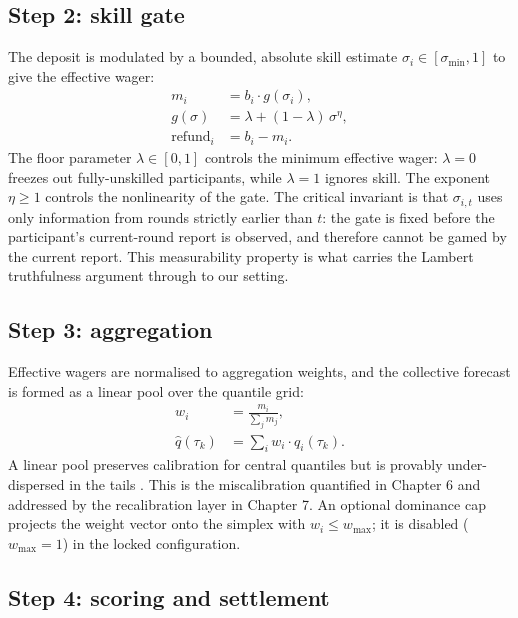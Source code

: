 \documentclass[
  11pt,
  a4paper,
  oneside]{report}
\begin{document}
\subsection{Step 2: skill gate}\label{step-2-skill-gate}

The deposit is modulated by a bounded, absolute skill estimate
\(\sigma_i \in [\sigma_{\min}, 1]\) to give the effective wager:
\begin{align}
  m_i &= b_i \cdot g(\sigma_i), \\
  g(\sigma) &= \lambda + (1 - \lambda)\, \sigma^{\eta}, \\
  \mathrm{refund}_i &= b_i - m_i.
\end{align} The floor parameter \(\lambda \in [0, 1]\) controls the
minimum effective wager: \(\lambda = 0\) freezes out fully-unskilled
participants, while \(\lambda = 1\) ignores skill. The exponent
\(\eta \geq 1\) controls the nonlinearity of the gate. The critical
invariant is that \(\sigma_{i,t}\) uses only information from rounds
strictly earlier than \(t\): the gate is fixed before the participant's
current-round report is observed, and therefore cannot be gamed by the
current report. This measurability property is what carries the Lambert
truthfulness argument through to our setting.

\subsection{Step 3: aggregation}\label{step-3-aggregation}

Effective wagers are normalised to aggregation weights, and the
collective forecast is formed as a linear pool over the quantile grid:
\begin{align}
  w_i &= \frac{m_i}{\sum_j m_j}, \\
  \hat q(\tau_k) &= \sum_i w_i \cdot q_i(\tau_k).
\end{align} A linear pool preserves calibration for central quantiles
but is provably under-dispersed in the tails
\citep{ranjan2010combining}. This is the miscalibration quantified in
Chapter 6 and addressed by the recalibration layer in Chapter 7. An
optional dominance cap projects the weight vector onto the simplex with
\(w_i \leq w_{\max}\); it is disabled (\(w_{\max} = 1\)) in the locked
configuration.

\subsection{Step 4: scoring and
settlement}\label{step-4-scoring-and-settlement}
\end{document}
